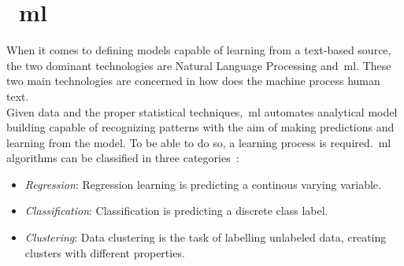\section{~\acl{ml}}
When it comes to defining models capable of learning from a text-based source, the two dominant technologies are Natural Language Processing and~\ac{ml}. These two main technologies are concerned in how does the machine process human text. \\
Given data and the proper statistical techniques,~\ac{ml} automates analytical model building capable of recognizing patterns with the aim of making predictions and learning from the model. To be able to do so, a learning process is required.~\ac{ml} algorithms can be classified in three categories~\cite{dataclust}:
\begin{itemize}
	\item \textit{Regression}: Regression learning is predicting a continous varying variable.
	\item \textit{Classification}: Classification is predicting a discrete class label.
	\item \textit{Clustering}: Data clustering is the task of labelling unlabeled data, creating clusters with different properties. 
\end{itemize} 

